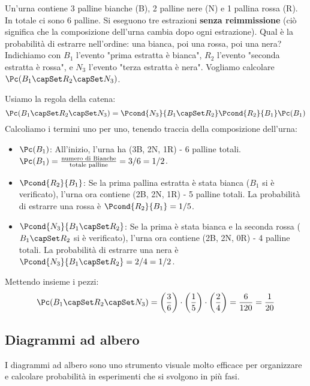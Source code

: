 \begin{example}
Un'urna contiene 3 palline bianche (B), 2 palline nere (N) e 1 pallina rossa (R). In totale ci sono 6 palline. Si eseguono tre estrazioni \textbf{senza reimmissione} (ciò significa che la composizione dell'urna cambia dopo ogni estrazione).
Qual è la probabilità di estrarre nell'ordine: una bianca, poi una rossa, poi una nera?
Indichiamo con $B_1$ l'evento "prima estratta è bianca", $R_2$ l'evento "seconda estratta è rossa", e $N_3$ l'evento "terza estratta è nera". Vogliamo calcolare $\Pc(B_1 \capSet R_2 \capSet N_3)$.

Usiamo la regola della catena:
\[ \Pc(B_1 \capSet R_2 \capSet N_3) = \Pcond{N_3}{B_1 \capSet R_2} \Pcond{R_2}{B_1} \Pc(B_1) \]
Calcoliamo i termini uno per uno, tenendo traccia della composizione dell'urna:
\begin{itemize}
    \item $\Pc(B_1)$: All'inizio, l'urna ha (3B, 2N, 1R) - 6 palline totali. $\Pc(B_1) = \frac{\text{numero di Bianche}}{\text{totale palline}} = 3/6 = 1/2$.
    \item $\Pcond{R_2}{B_1}$: Se la prima pallina estratta è stata bianca ($B_1$ si è verificato), l'urna ora contiene (2B, 2N, 1R) - 5 palline totali. La probabilità di estrarre una rossa è $\Pcond{R_2}{B_1} = 1/5$.
    \item $\Pcond{N_3}{B_1 \capSet R_2}$: Se la prima è stata bianca e la seconda rossa ($B_1 \capSet R_2$ si è verificato), l'urna ora contiene (2B, 2N, 0R) - 4 palline totali. La probabilità di estrarre una nera è $\Pcond{N_3}{B_1 \capSet R_2} = 2/4 = 1/2$.
\end{itemize}
Mettendo insieme i pezzi:
\[ \Pc(B_1 \capSet R_2 \capSet N_3) = \left(\frac{3}{6}\right) \cdot \left(\frac{1}{5}\right) \cdot \left(\frac{2}{4}\right) = \frac{6}{120} = \frac{1}{20} \]
\end{example}

\subsection{Diagrammi ad albero}
I diagrammi ad albero sono uno strumento visuale molto efficace per organizzare e calcolare probabilità in esperimenti che si svolgono in più fasi.

